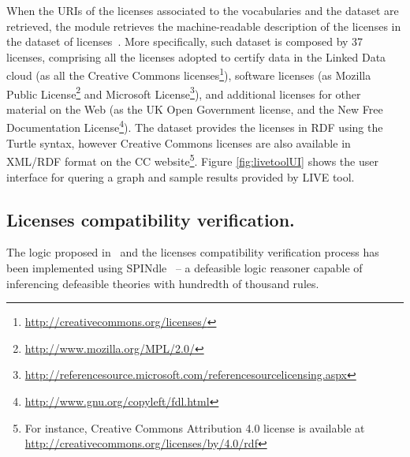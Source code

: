 When the URIs of the licenses associated to the vocabularies and the dataset are retrieved, the module retrieves the machine-readable description of the licenses in the dataset of licenses~\cite{CabrioESWC2014}. More specifically, such dataset is composed by 37 licenses, comprising all the licenses adopted to certify data in the Linked Data cloud (as all the Creative Commons licenses\footnote{\url{http://creativecommons.org/licenses/}}), software licenses (as Mozilla Public License\footnote{\url{http://www.mozilla.org/MPL/2.0/}} and Microsoft License\footnote{\url{http://referencesource.microsoft.com/referencesourcelicensing.aspx}}), and additional licenses for other material on the Web (as the UK Open Government license, and the New Free Documentation License\footnote{\url{http://www.gnu.org/copyleft/fdl.html}}). The dataset provides the licenses in RDF using the Turtle syntax, however Creative Commons licenses are also available in XML/RDF format on the CC website\footnote{For instance, Creative Commons Attribution 4.0 license is available at \url{http://creativecommons.org/licenses/by/4.0/rdf}}.
Figure \ref{fig:livetoolUI} shows the user interface for quering a graph and sample results provided by LIVE tool.

\begin{figure}[ht!b]
\end{figure}

\subsection{Licenses compatibility verification.}
The logic proposed in~\cite{DBLP:conf/semweb/GovernatoriRVG13}
and the licenses compatibility verification process has been implemented using SPINdle~\cite{spindle}
-- a defeasible logic reasoner capable of inferencing defeasible theories with hundredth of thousand rules.

